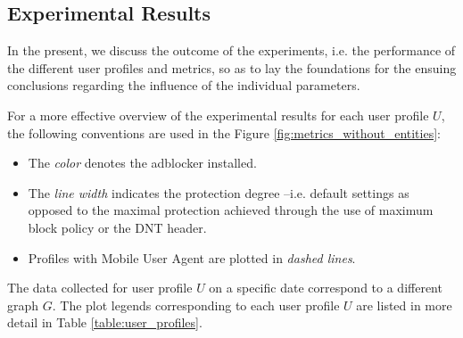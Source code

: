 \documentclass{sig-alternate}
\begin{document}
\subsection{Experimental Results}
In the present, we discuss the outcome of the experiments, i.e. the performance of the different user profiles and metrics, so as to lay the foundations for the ensuing conclusions regarding the influence of the individual parameters.

For a more effective overview of the experimental results for each user profile $U$, the following conventions are used in the Figure \ref{fig:metrics_without_entities}:
\begin{itemize}
 \item The \textit{color} denotes the adblocker installed.
 \item The \textit{line width} indicates the protection degree --i.e. default settings as opposed to the maximal protection achieved through the use of maximum block policy or the DNT header.
 \item Profiles with Mobile User Agent are plotted in \textit{dashed lines}.
\end{itemize}
The data collected for user profile $U$ on a specific date correspond to a different graph $G$. The plot legends corresponding to each user profile $U$ are listed in more detail in Table \ref{table:user_profiles}.

  \newcommand\solidthinrule[1][.5cm]{\rule[0.5ex]{#1}{.4pt}}
  \newcommand\solidthickrule[1][.5cm]{\rule[0.5ex]{#1}{1.5pt}}
  \newcommand\dashedthinrule{\mbox{%
    \solidthinrule[1mm]\hspace{1mm}\solidthinrule[1mm]\hspace{1mm}\solidthinrule[1mm]}}
  \newcommand\dashedthickrule{\mbox{%
    \solidthickrule[1mm]\hspace{1mm}\solidthickrule[1mm]\hspace{1mm}\solidthickrule[1mm]}}
\end{document}
